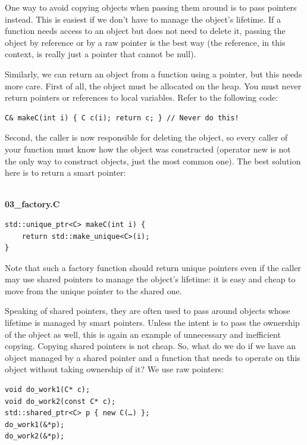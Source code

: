 
One way to avoid copying objects when passing them around is to pass pointers instead. This is easiest if we don’t have to manage the object’s lifetime. If a function needs access to an object but does not need to delete it, passing the object by reference or by a raw pointer is the best way (the reference, in this context, is really just a pointer that cannot be null). 

Similarly, we can return an object from a function using a pointer, but this needs more care. First of all, the object must be allocated on the heap. You must never return pointers or references to local variables. Refer to the following code:

\begin{lstlisting}[style=styleCXX]
C& makeC(int i) { C c(i); return c; } // Never do this!
\end{lstlisting}

Second, the caller is now responsible for deleting the object, so every caller of your function must know how the object was constructed (operator new is not the only way to construct objects, just the most common one). The best solution here is to return a smart pointer:

\hspace*{\fill} \\ %
\noindent
\textbf{03\_factory.C}
\begin{lstlisting}[style=styleCXX]
std::unique_ptr<C> makeC(int i) {
	return std::make_unique<C>(i);
}
\end{lstlisting}

Note that such a factory function should return unique pointers even if the caller may use shared pointers to manage the object’s lifetime: it is easy and cheap to move from the unique pointer to the shared one.

Speaking of shared pointers, they are often used to pass around objects whose lifetime is managed by smart pointers. Unless the intent is to pass the ownership of the object as well, this is again an example of unnecessary and inefficient copying. Copying shared pointers is not cheap. So, what do we do if we have an object managed by a shared pointer and a function that needs to operate on this object without taking ownership of it? We use raw pointers:

\begin{lstlisting}[style=styleCXX]
void do_work1(C* c);
void do_work2(const C* c);
std::shared_ptr<C> p { new C(…) };
do_work1(&*p);
do_work2(&*p);
\end{lstlisting}

